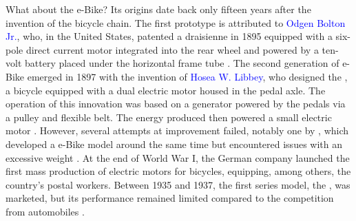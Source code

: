 \begin{refsegment}
What about the \acrfull{e-Bike}? Its origins date back only fifteen years after the invention of the bicycle chain. The first prototype is attributed to \textcolor{blue}{Odgen Bolton Jr.}, who, in the United States, patented a draisienne in 1895 equipped with a six-pole direct current motor integrated into the rear wheel and powered by a ten-volt battery placed under the horizontal frame tube \textcolor{blue}{\autocites[3]{hung_review_2020}{adelski_qui_2023}}. The second generation of \acrshort{e-Bike} emerged in 1897 with the invention of \textcolor{blue}{Hosea W. Libbey}, who designed the , a bicycle equipped with a dual electric motor housed in the pedal axle. The operation of this innovation was based on a generator powered by the pedals via a pulley and flexible belt. The energy produced then powered a small electric motor \textcolor{blue}{\autocite[3]{hung_review_2020}}. However, several attempts at improvement failed, notably one by , which developed a \acrshort{e-Bike} model around the same time but encountered issues with an excessive weight \textcolor{blue}{\autocite[78]{hadland_bicycle_2016}}. At the end of World War I, the German company  launched the first mass production of electric motors for bicycles, equipping, among others, the country’s postal workers. Between 1935 and 1937, the first series model, the , was marketed, but its performance remained limited compared to the competition from automobiles \textcolor{blue}{\autocite[143]{smethurst_bicycle_2015}}.%


\end{refsegment}
